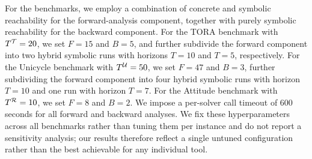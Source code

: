 \documentclass[letterpaper, 10 pt, conference]{ieeeconf}  %
\begin{document}
For the \fab benchmarks, we employ a combination of concrete and symbolic reachability for the forward-analysis component, together with purely symbolic reachability for the backward component. 
For the TORA benchmark with $T^{\mathcal{T}} = 20$, we set $F = 15$ and $B = 5$, and further subdivide the forward component into two hybrid symbolic runs with horizons $T = 10$ and $T = 5$, respectively. 
For the Unicycle benchmark with $T^{\mathcal{U}} = 50$, we set $F = 47$ and $B = 3$, further subdividing the forward component into four hybrid symbolic runs with horizon $T = 10$ and one run with horizon $T = 7$. 
For the Attitude benchmark with $T^{\mathcal{R}} = 10$, we set $F = 8$ and $B = 2$. We impose a per-solver call timeout of $600$ seconds for all forward and backward analyses.
We fix these hyperparameters across all benchmarks rather than tuning them per instance and do not report a sensitivity analysis; our results therefore reflect a single untuned configuration rather than the best achievable for any individual tool.
\begin{table}[h!]
    \centering
    \caption{Comparing \fab to forward-only analysis. Times in seconds.
      Improvement is the signed speedup: $r>0$ means \fab is $r\times$ faster,
      $r<0$ that it is $|r|\times$ slower.}
    \label{tab:forward-only-fabric-improvement}
\end{table}
\end{document}
